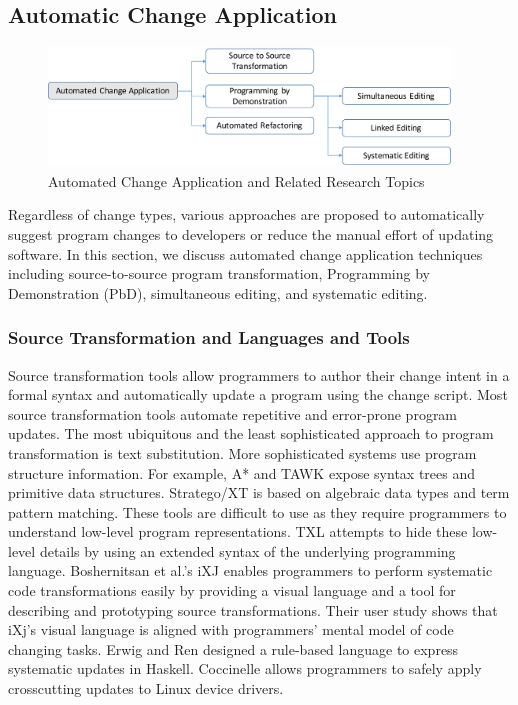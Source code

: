 \documentclass[runningheads,a4paper]{llncs}
\begin{document}
\subsection{Automatic Change Application}
\label{sec:automatic}


\begin{figure}[ht]
 \centering
 \includegraphics[width=0.95\textwidth]{images/AutomatedChange.pdf}
 \caption{Automated Change Application and Related Research Topics} 
 \label{fig:automaticapplication} 
\end{figure}



Regardless of change types, various approaches are proposed to automatically suggest program changes to developers or reduce the manual effort of updating software. In this section, we discuss automated change application techniques including source-to-source program transformation, Programming by Demonstration (PbD), simultaneous editing, and systematic editing.

\subsubsection{Source Transformation and Languages and Tools} 

Source transformation tools allow programmers to author their change intent in a formal syntax and automatically update a program using the change script. Most source transformation tools automate repetitive and error-prone program updates. The most ubiquitous and the least sophisticated approach to program transformation is text substitution. More sophisticated systems use program structure information. For example, A* \cite{Ladd1995} and TAWK \cite{Griswold1996} expose syntax trees and primitive data structures. Stratego/XT\cite{Visser2004} is based on algebraic data types and term pattern matching. These tools are difficult to use as they require programmers to understand low-level program representations. TXL \cite{Cordy2006} attempts to hide these low-level details by using an extended syntax of the underlying programming language. Boshernitsan et al.'s iXJ \cite{Boshernitsan2007} enables programmers to perform systematic code transformations easily by providing a visual language and a tool for describing and prototyping source transformations. Their user study shows that iXj's visual language is aligned with programmers' mental model of code changing tasks. Erwig and Ren \cite{Erwig2002} designed a rule-based language to express systematic updates in Haskell. Coccinelle \cite{Padioleau2008} allows programmers to safely apply crosscutting updates to Linux device drivers. 
\end{document}
